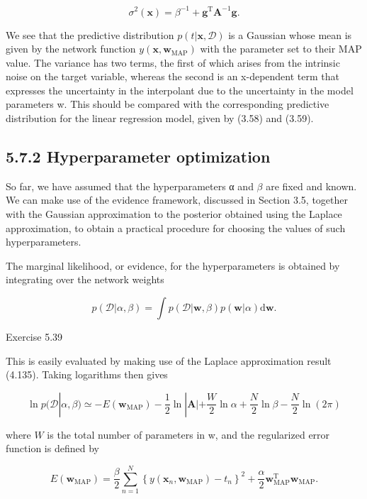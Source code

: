 \documentclass[
  10
]{article}
\begin{document}
\[
\sigma^ {2} (\mathbf {x}) = \beta^ {- 1} + \mathbf {g} ^ {\mathrm{T}} \mathbf {A} ^ {- 1} \mathbf {g}.\tag{5.173}
\]

We see that the predictive distribution
\(p ( t | \mathbf { x } , \mathcal { D } )\) is a Gaussian whose mean is
given by the network function
\(y ( \mathbf { x } , \mathbf { w } _ { \mathrm { M A P } } )\) with the
parameter set to their MAP value. The variance has two terms, the first
of which arises from the intrinsic noise on the target variable, whereas
the second is an x-dependent term that expresses the uncertainty in the
interpolant due to the uncertainty in the model parameters w. This
should be compared with the corresponding predictive distribution for
the linear regression model, given by (3.58) and (3.59).

\subsection{5.7.2 Hyperparameter
optimization}\label{hyperparameter-optimization}

So far, we have assumed that the hyperparameters α and \(\beta\) are
fixed and known. We can make use of the evidence framework, discussed in
Section 3.5, together with the Gaussian approximation to the posterior
obtained using the Laplace approximation, to obtain a practical
procedure for choosing the values of such hyperparameters.

The marginal likelihood, or evidence, for the hyperparameters is
obtained by integrating over the network weights

\[
p (\mathcal {D} | \alpha , \beta) = \int p (\mathcal {D} | \mathbf {w}, \beta) p (\mathbf {w} | \alpha) \mathrm{d} \mathbf {w}.\tag{5.174}
\]

Exercise 5.39

This is easily evaluated by making use of the Laplace approximation
result (4.135). Taking logarithms then gives

\[
\ln p (\mathcal {D} | \alpha , \beta) \simeq - E (\mathbf {w} _ {\mathrm{MAP}}) - \frac {1}{2} \ln | \mathbf {A} | + \frac {W}{2} \ln \alpha + \frac {N}{2} \ln \beta - \frac {N}{2} \ln (2 \pi)\tag{5.175}
\]

where \(W\) is the total number of parameters in w, and the regularized
error function is defined by

\[
E (\mathbf {w} _ {\mathrm{MAP}}) = \frac {\beta}{2} \sum_ {n = 1} ^ {N} \left\{y (\mathbf {x} _ {n}, \mathbf {w} _ {\mathrm{MAP}}) - t _ {n} \right\} ^ {2} + \frac {\alpha}{2} \mathbf {w} _ {\mathrm{MAP}} ^ {\mathrm{T}} \mathbf {w} _ {\mathrm{MAP}}.\tag{5.176}
\]
\end{document}
